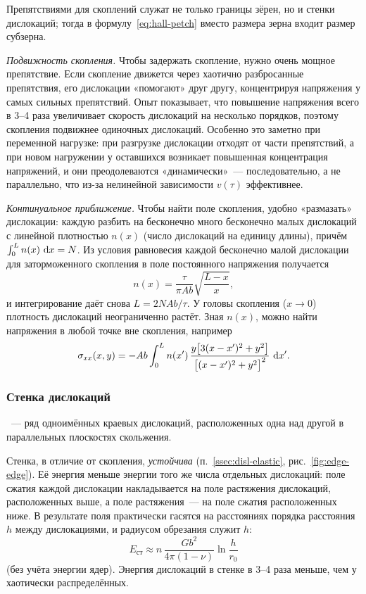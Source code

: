 Препятствиями для скоплений служат не только границы зёрен, но и стенки
дислокаций; тогда в формулу~\eqref{eq:hall-petch} вместо размера зерна
входит размер субзерна.

\begin{podrobnee}
\emph{Подвижность скопления.} Чтобы задержать скопление, нужно очень
мощное препятствие. Если скопление движется через хаотично разбросанные
препятствия, его дислокации «помогают» друг другу, концентрируя напряжения
у самых сильных препятствий. Опыт показывает, что повышение напряжения
всего в 3--4 раза увеличивает скорость дислокаций на несколько порядков,
поэтому скопления подвижнее одиночных дислокаций. Особенно это заметно
при переменной нагрузке: при разгрузке дислокации отходят от части
препятствий, а при новом нагружении у оставшихся возникает повышенная
концентрация напряжений, и они преодолеваются «динамически»~—
последовательно, а не параллельно, что из-за нелинейной зависимости
$v(\tau)$ эффективнее.

\emph{Континуальное приближение.} Чтобы найти поле скопления, удобно
«размазать» дислокации: каждую разбить на бесконечно много бесконечно
малых дислокаций с линейной плотностью $n(x)$ (число дислокаций на
единицу длины), причём $\int_0^Ln(x)\,\mathop{}\!\mathrm{d} x=N$. Из условия равновесия
каждой бесконечно малой дислокации для заторможенного скопления в поле
постоянного напряжения получается
\[
n(x)=\frac{\tau}{\pi Ab}\sqrt{\frac{L-x}{x}} ,
\]
и интегрирование даёт снова $L=2NAb/\tau$. У головы скопления
($x\to0$) плотность дислокаций неограниченно растёт. Зная $n(x)$, можно
найти напряжения в любой точке вне скопления, например
\[
\sigma_{xx}(x,y)=-Ab\int_0^Ln(x')\,\frac{y\bigl[3(x-x')^2+y^2\bigr]}{\bigl[(x-x')^2+y^2\bigr]^2}\,\mathop{}\!\mathrm{d} x' .
\]
\end{podrobnee}

\subsubsection{Стенка дислокаций}

\begin{opredelenie}
~— ряд одноимённых краевых дислокаций,
расположенных одна над другой в параллельных плоскостях скольжения.
\end{opredelenie}

Стенка, в отличие от скопления, \emph{устойчива}
(п.~\ref{ssec:disl-elastic}, рис.~\ref{fig:edge-edge}). Её энергия меньше
энергии того же числа отдельных дислокаций: поле сжатия каждой дислокации
накладывается на поле растяжения дислокаций, расположенных выше, а поле
растяжения~— на поле сжатия расположенных ниже. В результате поля
практически гасятся на расстояниях порядка расстояния $h$ между
дислокациями, и радиусом обрезания служит $h$:
\begin{equation}\label{eq:wall-energy}
E_{\text{ст}}\approx n\,\frac{Gb^2}{4\pi(1-\nu)}\ln\frac{h}{r_0}
\end{equation}
(без учёта энергии ядер). Энергия дислокаций в стенке в 3--4 раза
меньше, чем у хаотически распределённых.

